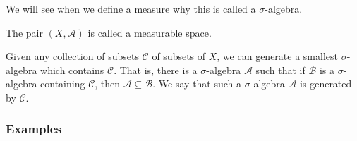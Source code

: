 \documentclass{article}
\begin{document}
We will see when we define a measure why this is called a $\sigma$-algebra.

The pair $(X, \mathcal{A})$ is called a measurable space.

Given any collection of subsets $\mathcal{C}$ of subsets of $X$, we can generate a 
smallest $\sigma$-algebra which contains $\mathcal{C}$. That is, there is a $\sigma$-algebra 
$\mathcal{A}$ such that if $\mathcal{B}$ is a $\sigma$-algebra containing $\mathcal{C}$, then 
$\mathcal{A} \subseteq \mathcal{B}$. We say that such a $\sigma$-algebra $\mathcal{A}$ is
generated by $\mathcal{C}$.

\subsubsection{Examples}
\end{document}
